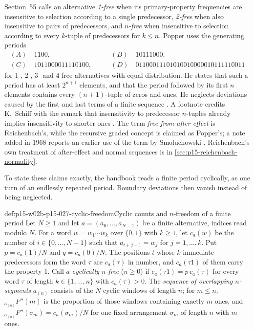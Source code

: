 Section~55 calls an alternative \emph{1-free} when its primary-property
frequencies are insensitive to selection according to a single
predecessor, \emph{2-free} when also insensitive to pairs of
predecessors, and \emph{\(n\)-free} when insensitive to selection
according to every \(k\)-tuple of predecessors for \(k\leq n\).
Popper uses the generating periods
\[
\begin{aligned}
(A)&\ 1100, &\qquad (B)&\ 10111000,\\
(C)&\ 1011000011110100, &\qquad
(D)&\ 01100011101010010000010111110011
\end{aligned}
\]
for 1-, 2-, 3- and 4-free alternatives with equal distribution. He
states that such a period has at least \(2^{n+1}\) elements, and that
the period followed by its first \(n\) elements contains every
\((n+1)\)-tuple of zeros and ones. He neglects deviations caused by the
first and last terms of a finite sequence
\parencite[\S55]{Popper2002LogicDiscoveryUI}.
A footnote credits K.~Schiff with the remark that insensitivity to
predecessor \(n\)-tuples already implies insensitivity to shorter ones
\parencite[\S55, note~1]{Popper2002LogicDiscoveryUI}.
The term \emph{free from after-effect} is Reichenbach's, while the
recursive graded concept is claimed as Popper's; a note added in 1968
reports an earlier use of the term by Smoluchowski
\parencite[\S55, note~*2]{Popper2002LogicDiscoveryUI}.
Reichenbach's own treatment of after-effect and normal sequences is
in \cref{sec:p15-reichenbach-normality}.

To state these claims exactly, the handbook reads a finite period
cyclically, as one turn of an endlessly repeated period. Boundary
deviations then vanish instead of being neglected.

\begin{hbdefinition}{def:p15-w02b-p15-027-cyclic-freedom}{Cyclic counts and \texorpdfstring{\(n\)}{n}-freedom of a finite period}
Let \(N\geq1\) and let \(a=(a_0,\ldots,a_{N-1})\) be a finite alternative,
indices read modulo \(N\). For a word \(w=w_1\cdots w_k\) over
\(\{0,1\}\) with \(k\geq1\), let \(c_a(w)\) be the number of
\(i\in\{0,\ldots,N-1\}\) such that \(a_{i+j-1}=w_j\) for
\(j=1,\ldots,k\). Put \(p=c_a(1)/N\) and \(q=c_a(0)/N\).
The positions \(t\) whose \(k\) immediate predecessors form the word
\(\tau\) are \(c_a(\tau)\) in number, and \(c_a(\tau1)\) of them carry
the property \(1\).
Call \(a\) \emph{cyclically \(n\)-free} (\(n\geq0\)) if
\(c_a(\tau1)=p\,c_a(\tau)\) for every word \(\tau\) of length
\(k\in\{1,\ldots,n\}\) with \(c_a(\tau)>0\).
The \emph{sequence of overlapping \(n\)-segments} \(a_{(n)}\) consists
of the \(N\) cyclic windows of length \(n\); for \(m\leq n\),
\({}_{a_{(n)}}F''(m)\) is the proportion of those windows containing
exactly \(m\) ones, and \({}_{a_{(n)}}F''(\sigma_m)=c_a(\sigma_m)/N\)
for one fixed arrangement \(\sigma_m\) of length \(n\) with \(m\) ones.
\end{hbdefinition}

